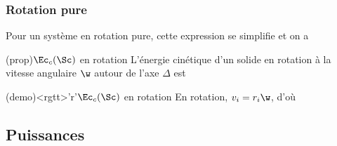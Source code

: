 \documentclass[../../main/main.tex]{subfiles}
\begin{document}
\subsubsection{Rotation pure}
Pour un système en rotation pure, cette expression se simplifie et on a
\begin{tcbraster}[raster equal height=rows, raster columns=2]
	\begin{tcb*}(prop){$\Ec_c(\Sc)$ en rotation}
		L'énergie cinétique d'un solide en rotation à la vitesse angulaire $\w$
		autour de l'axe $\Delta$ est
		\psw{
		\[
			\boxed{\Ec_{c, \rm rot} = \frac{1}{2}J_{\D}\w^2}
		\]
		}
		\vspace{-15pt}
	\end{tcb*}
	\begin{tcb*}(demo)<rgtt>'r'{$\Ec_c(\Sc)$ en rotation}
		En rotation, $v_i = r_i\w$, d'où
		\vspace{-15pt}
	\end{tcb*}
\end{tcbraster}

\subsection{Puissances}
\end{document}
